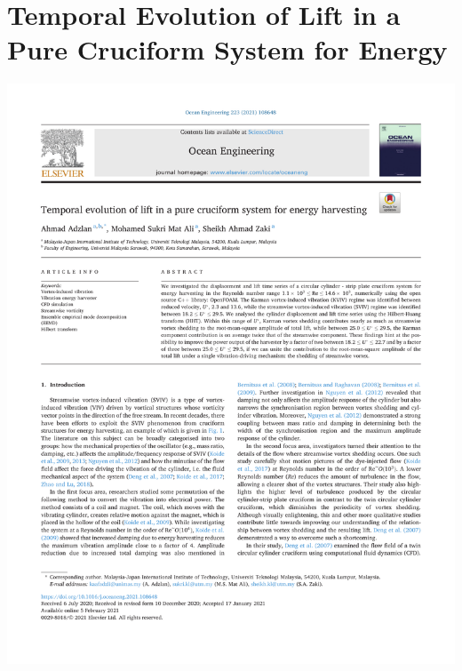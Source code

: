 \documentclass[oneside]{utmthesis}
\begin{document}
\appendix
\chapter{Temporal Evolution of Lift in a Pure Cruciform System for Energy}
\begin{center}
  \includegraphics[width=1\textwidth]{figs/appendix_WoS}
\end{center}
\end{document}
